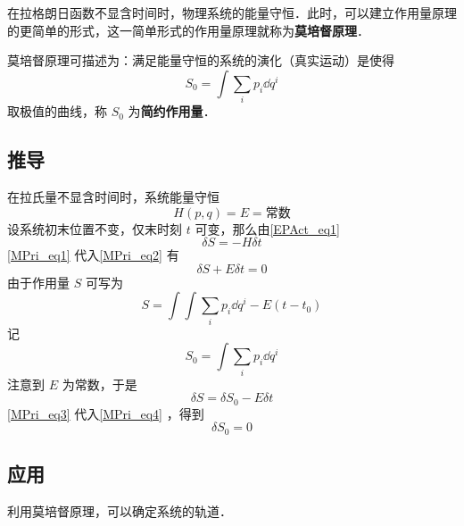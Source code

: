 在拉格朗日函数不显含时间时，物理系统的能量守恒．此时，可以建立作用量原理的更简单的形式，这一简单形式的作用量原理就称为\textbf{莫培督原理}．

莫培督原理可描述为：满足能量守恒的系统的演化（真实运动）是使得
\begin{equation}
S_0=\int\sum_i p_i\dd q^i
\end{equation}
取极值的曲线，称 $S_0$ 为\textbf{简约作用量}．
\subsection{推导}
在拉氏量不显含时间时，系统能量守恒
\begin{equation}\label{MPri_eq1}
H(p,q)=E=\text{常数}
\end{equation}
设系统初末位置不变，仅末时刻 $t$ 可变，那么由\autoref{EPAct_eq1}~
\begin{equation}\label{MPri_eq2}
\delta S=-H\delta t
\end{equation}
\autoref{MPri_eq1} 代入\autoref{MPri_eq2} 有
\begin{equation}\label{MPri_eq4}
\delta S+E\delta t=0
\end{equation}
由于作用量 $S$ 可写为
\begin{equation}
S=\int \int\sum_i p_i\dd q^i-E(t-t_0)
\end{equation}
记
\begin{equation}
S_0=\int\sum_i p_i\dd q^i
\end{equation}
注意到 $E$ 为常数，于是
\begin{equation}\label{MPri_eq3}
\delta S=\delta S_0-E\delta t
\end{equation}
\autoref{MPri_eq3} 代入\autoref{MPri_eq4} ，得到
\begin{equation}
\delta S_0=0
\end{equation}
\subsection{应用}
利用莫培督原理，可以确定系统的轨道．